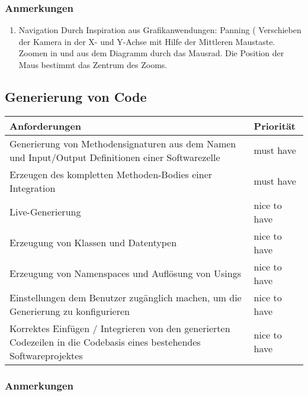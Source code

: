 \subsubsection{Anmerkungen}
\label{sec:orgheadline10}
\begin{enumerate}
\item Navigation
\label{sec:orgheadline9}
Durch Inspiration aus Grafikanwendungen: Panning ( Verschieben der Kamera in
der X- und Y-Achse mit Hilfe der Mittleren Maustaste. Zoomen in und aus dem
Diagramm durch das Mausrad. Die Position der Maus bestimmt das Zentrum des
Zooms.
\end{enumerate}




\subsection{Generierung von Code}
\label{sec:orgheadline16}
\begin{center}
\begin{tabular}{ll}
Anforderungen & Priorität\\
\hline
Generierung von Methodensignaturen aus dem Namen und Input/Output Definitionen einer Softwarezelle & must have\\
Erzeugen des kompletten Methoden-Bodies einer Integration & must have\\
Live-Generierung & nice to have\\
Erzeugung von Klassen und Datentypen & nice to have\\
Erzeugung von Namenspaces und Auflösung von Usings & nice to have\\
Einstellungen  dem Benutzer zugänglich machen, um die Generierung zu konfigurieren & nice to have\\
Korrektes Einfügen / Integrieren von den generierten Codezeilen in die Codebasis eines bestehendes Softwareprojektes & nice to have\\
\end{tabular}
\end{center}
\subsubsection{Anmerkungen}

